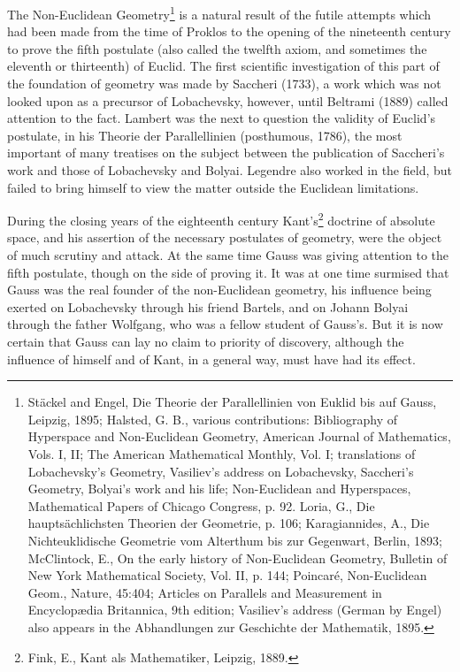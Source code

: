 \documentclass[oneside]{book}
\begin{document}
{The Non-Euclidean Geometry\footnote{St\"ackel and Engel, Die
Theorie der Parallellinien von Euklid bis auf Gauss, Leipzig, 1895;
Halsted, G. B., various contributions: Bibliography of Hyperspace
and Non-Euclidean Geometry, American Journal of Mathematics,
Vols. I, II; The American Mathematical Monthly, Vol. I; translations
of Lobachevsky's Geometry, Vasiliev's address on Lobachevsky,
Saccheri's Geometry, Bolyai's work and his life; Non-Euclidean and
Hyperspaces, Mathematical Papers of Chicago Congress, p. 92. Loria,
G., Die haupts\"achlichsten Theorien der Geometrie, p. 106;
Karagiannides, A., Die Nichteuklidische Geometrie vom Alterthum bis
zur Gegenwart, Berlin, 1893; McClintock, E., On the early history of
Non-Euclidean Geometry, Bulletin of New York Mathematical Society,
Vol. II, p. 144; Poincar\'e, Non-Euclidean Geom., Nature, 45:404;
Articles on Parallels and Measurement in Encyclop\ae{}dia Britannica,
9th edition; Vasiliev's address (German by Engel) also appears in
the Abhandlungen zur Geschichte der Mathematik, 1895.} is a natural
result of the futile attempts which had been made from the time of
Proklos to the opening of the nineteenth century to prove the fifth
postulate (also called the twelfth axiom, and sometimes the eleventh
or thirteenth) of Euclid. The first scientific investigation of
this part of the foundation of geometry was made by Saccheri (1733),
a work which was not looked upon as a precursor of Lobachevsky,
however, until Beltrami (1889) called attention to the fact. Lambert
was the next to question the validity of Euclid's postulate, in his
Theorie der Parallellinien (posthumous, 1786), the most important of
many treatises on the subject between the publication of Saccheri's
work and those of Lobachevsky and Bolyai. Legendre also worked in
the field, but failed to bring himself to view the matter outside
the Euclidean limitations.

During the closing years of the eighteenth century
Kant's\footnote{Fink, E., Kant als Mathematiker, Leipzig, 1889.}
doctrine of absolute space, and his assertion of the necessary
postulates of geometry, were the object of much scrutiny and
attack. At the same time Gauss was giving attention to the fifth
postulate, though on the side of proving it. It was at one time
surmised that Gauss was the real founder of the non-Euclidean
geometry, his influence being exerted on Lobachevsky through his
friend Bartels, and on Johann Bolyai through the father Wolfgang,
who was a fellow student of Gauss's. But it is now certain that
Gauss can lay no claim to priority of discovery, although the
influence of himself and of Kant, in a general way, must have had
its effect.

}
\end{document}
